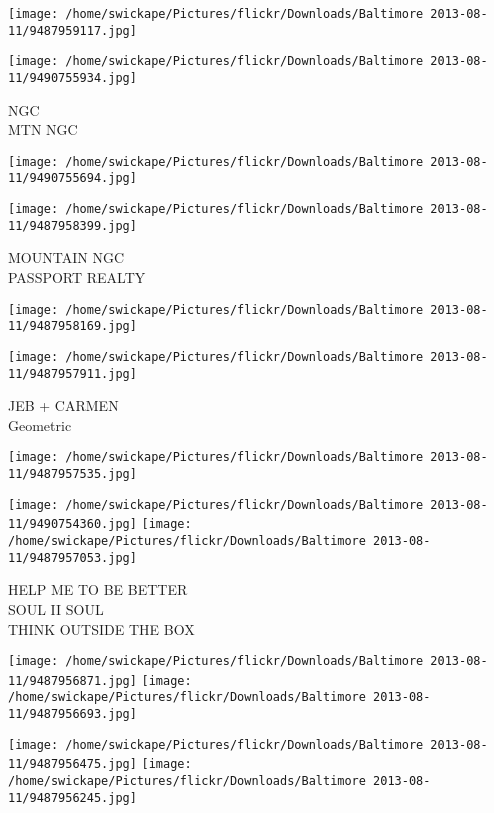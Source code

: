 \documentclass[10pt,letterpaper]{article}
\begin{document}
\texttt{[image: /home/swickape/Pictures/flickr/Downloads/Baltimore 2013-08-11/9487959117.jpg]}

\vspace{0.25in}
\texttt{[image: /home/swickape/Pictures/flickr/Downloads/Baltimore 2013-08-11/9490755934.jpg]}

NGC\\
MTN NGC\\
\pagebreak

\texttt{[image: /home/swickape/Pictures/flickr/Downloads/Baltimore 2013-08-11/9490755694.jpg]}

\vspace{0.25in}
\texttt{[image: /home/swickape/Pictures/flickr/Downloads/Baltimore 2013-08-11/9487958399.jpg]}

MOUNTAIN NGC\\
PASSPORT REALTY\\
\pagebreak

\texttt{[image: /home/swickape/Pictures/flickr/Downloads/Baltimore 2013-08-11/9487958169.jpg]}

\vspace{0.25in}
\texttt{[image: /home/swickape/Pictures/flickr/Downloads/Baltimore 2013-08-11/9487957911.jpg]}

JEB + CARMEN\\
Geometric\\
\pagebreak

\texttt{[image: /home/swickape/Pictures/flickr/Downloads/Baltimore 2013-08-11/9487957535.jpg]}

\vspace{0.25in}
\texttt{[image: /home/swickape/Pictures/flickr/Downloads/Baltimore 2013-08-11/9490754360.jpg]}
\texttt{[image: /home/swickape/Pictures/flickr/Downloads/Baltimore 2013-08-11/9487957053.jpg]}

HELP ME TO BE BETTER\\
SOUL II SOUL\\
THINK OUTSIDE THE BOX\\
\pagebreak

\texttt{[image: /home/swickape/Pictures/flickr/Downloads/Baltimore 2013-08-11/9487956871.jpg]}
\texttt{[image: /home/swickape/Pictures/flickr/Downloads/Baltimore 2013-08-11/9487956693.jpg]}

\texttt{[image: /home/swickape/Pictures/flickr/Downloads/Baltimore 2013-08-11/9487956475.jpg]}
\texttt{[image: /home/swickape/Pictures/flickr/Downloads/Baltimore 2013-08-11/9487956245.jpg]}
\end{document}
